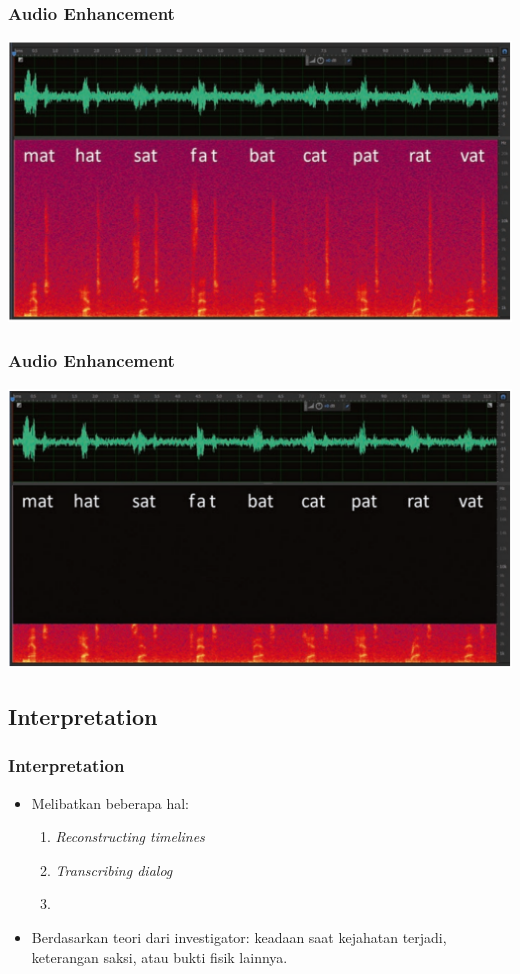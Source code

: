 \documentclass[pdflatex,compress]{beamer}
\begin{document}
\begin{frame}
	\frametitle{Audio Enhancement}
	
	\begin{center}
		\includegraphics[width=0.8\linewidth]{img/img005}
	\end{center}
	
\end{frame}

\begin{frame}
	\frametitle{Audio Enhancement}
	
	\begin{center}
		\includegraphics[width=0.8\linewidth]{img/img006}
	\end{center}
	
\end{frame}

\subsection{Interpretation}

\begin{frame}
	\frametitle{Interpretation}
	\begin{itemize}
		\item Melibatkan beberapa hal:
		\begin{enumerate}
			\item \textit{Reconstructing timelines}
			\item \textit{Transcribing dialog}
			\item {}
		\end{enumerate}
		\item Berdasarkan teori dari investigator: keadaan saat kejahatan terjadi, keterangan saksi, atau bukti fisik lainnya.
	\end{itemize}
\end{frame}
\end{document}
